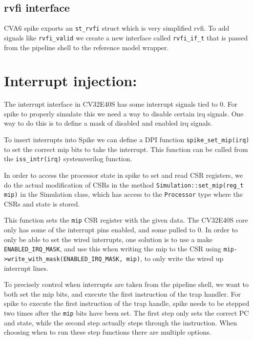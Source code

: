 \subsection{rvfi interface}

CVA6 spike exports an \lstinline{st_rvfi} struct which is very simplified rvfi. To add signals like \lstinline{rvfi_valid} we create a new interface called \lstinline{rvfi_if_t} that is passed from the pipeline shell to the reference model wrapper. 






\section{Interrupt injection: }

The interrupt interface in CV32E40S has some interrupt signals tied to 0. For spike to properly simulate this we need a way to disable certain irq signals. One way to do this is to define a mask of disabled and enabled irq signals.


To insert interrupts into Spike we can define a DPI function \lstinline{spike_set_mip(irq)} to set the correct mip bits to take the interrupt. This function can be called from the \lstinline{iss_intr(irq)} systemverilog function.

In order to access the processor state in spike to set and read CSR registers, we do the actual modification of CSRs in the method \lstinline{Simulation::set_mip(reg_t mip)} in the Simulation class, which has access to the \lstinline{Processor} type where the CSRs and state is stored.

This function sets the \lstinline{mip} CSR register with the given data. The CV32E40S core only has some of the interrupt pins enabled, and some pulled to 0\cite{openhwgroupExceptionsInterruptsCOREV2023}. In order to only be able to set the wired interrupts, one solution is to use a make \lstinline{ENABLED_IRQ_MASK}, and use this when writing the mip to the CSR using \lstinline{mip->write_with_mask(ENABLED_IRQ_MASK, mip)}, to only write the wired up interrupt lines.


To precisely control when interrupts are taken from the pipeline shell, we want to both set the mip bits, and execute the first instruction of the trap handler. For spike to execute the first instruction of the trap handle, spike needs to be stepped two times after the \lstinline{mip} bits have been set. The first step only sets the correct PC and state, while the second step actually steps through the instruction. When choosing when to run these step functions there are multiple options.

